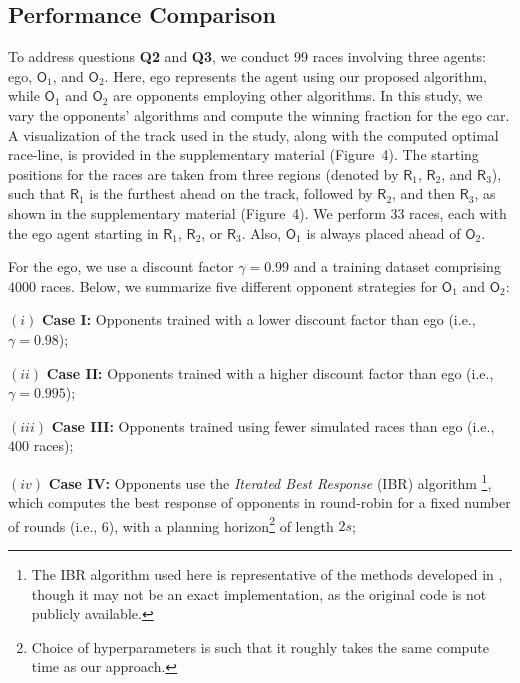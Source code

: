 \vspace{-5mm}
\subsection{Performance Comparison}
\vspace{-2mm}
To address questions \textbf{Q2} and \textbf{Q3}, we conduct 99 races involving three agents: \textsf{ego}, \(\textsf{O}_1\), and \(\textsf{O}_2\). Here, \textsf{ego} represents the agent using our proposed algorithm, while \(\textsf{O}_1\) and \(\textsf{O}_2\) are opponents employing other algorithms. In this study, we vary the opponents' algorithms and compute the winning fraction for the \textsf{ego} car. A visualization of the track used in the study, along with the computed optimal race-line, is provided in the supplementary material (Figure~4).
The starting positions for the races are taken from three regions (denoted by \(\textsf{R}_1\), \(\textsf{R}_2\), and \(\textsf{R}_3\)), such that \(\textsf{R}_1\) is the furthest ahead on the track, followed by \(\textsf{R}_2\), and then \(\textsf{R}_3\), as shown in the supplementary material (Figure~4). We perform 33 races, each with the \textsf{ego} agent starting in \(\textsf{R}_1\), \(\textsf{R}_2\), or \(\textsf{R}_3\). Also, \(\textsf{O}_1\) is always placed ahead of \(\textsf{O}_2\).

For the \textsf{ego}, we use a discount factor \(\gamma = 0.99\) and a training dataset comprising \(4000\) races. Below, we summarize five different opponent strategies for \(\textsf{O}_1\) and \(\textsf{O}_2\):

\noindent \((i)\) \textbf{Case I:} Opponents trained with a lower discount factor than \textsf{ego} (i.e., \(\gamma = 0.98\)); 

\noindent \((ii)\) \textbf{Case II:} Opponents trained with a higher discount factor than \textsf{ego} (i.e., \(\gamma = 0.995\));

\noindent \((iii)\) \textbf{Case III:} Opponents trained using fewer simulated races than \textsf{ego} (i.e., \(400\) races);

\noindent \((iv)\) \textbf{Case IV:} Opponents use the \textit{Iterated Best Response} (IBR) algorithm \footnote{The IBR algorithm used here is representative of the methods developed in \cite{spica2020real, Wang2020MultiagentSE}, though it may not be an exact implementation, as the original code is not publicly available.}, which computes the best response of opponents in round-robin for a fixed number of rounds (i.e., 6), with a planning horizon\footnote{Choice of hyperparameters is such that it roughly takes the same compute time as our approach.} of length \(2s\);

